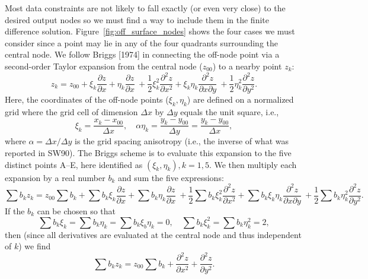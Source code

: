 \documentclass[12pt,letterpaper,margin=0.5in]{article}
\begin{document}
Most data constraints are not likely to fall exactly (or even very close) to the
desired output nodes so we must find a way to include them in the finite difference
solution.  Figure~\ref{fig:off_surface_nodes} shows the four cases we must consider since
a point may lie in any of the four quadrants surrounding the central node.
We follow Briggs [1974] in connecting the off-node point via a
second-order Taylor expansion from the central node ($z_{00}$) to a nearby point $z_k$:
\begin{equation}
	z_k = z_{00} + \xi_k \frac{\partial z}{\partial x} + \eta_k \frac{\partial z}{\partial x} \
	+ \frac{1}{2} \xi^2_k \frac{\partial^2 z}{\partial x^2} + \xi_k \eta_k \frac{\partial^2 z}{\partial x \partial y} \
	+ \frac{1}{2}  \eta^2_k \frac{\partial^2 z}{\partial y^2}.
\end{equation}
Here, the coordinates of the off-node points ($\xi_k, \eta_k$) are defined on a normalized
grid where the grid cell of dimension $\Delta x$ by $\Delta y$ equals the unit square, i.e.,
\begin{equation}
\xi_k = \frac{x_k-x_{00}}{\Delta x}, \quad \alpha \eta_k = \frac{y_k-y_{00}}{\Delta y} = \frac{y_k-y_{00}}{\Delta x},
\end{equation}
where $\alpha = \Delta x/ \Delta y$ is the grid spacing anisotropy (i.e., the inverse of what was reported in SW90).
The Briggs scheme is to evaluate this expansion to the five distinct points A--E, here identified as $(\xi_k, \eta_k), k = 1,5$.
We then multiply each expansion by a real number $b_k$ and sum the five expressions:
\begin{equation}
	\sum b_k z_k = z_{00}\sum b_k  + \sum b_k \xi_k \frac{\partial z}{\partial x} + \sum b_k \eta_k \frac{\partial z}{\partial x} \
	+ \frac{1}{2} \sum b_k \xi^2_k \frac{\partial^2 z}{\partial x^2} + \sum b_k \xi_k \eta_k \frac{\partial^2 z}{\partial x \partial y} \
	+ \frac{1}{2} \sum b_k \eta^2_k \frac{\partial^2 z}{\partial y^2}.
\end{equation}
If the $b_k$ can be chosen so that
\begin{equation}
\sum b_k \xi_k = \sum b_k \eta_k = \sum b_k \xi_b \eta_k = 0, \quad \sum b_k \xi^2_k = \sum b_k \eta^2_k = 2,
\label{eq:define}
\end{equation}
then (since all derivatives are evaluated at the central node and thus independent of $k$) we find
\begin{equation}
	\sum b_k z_k = z_{00}\sum b_k  + \frac{\partial^2 z}{\partial x^2} + \frac{\partial^2 z}{\partial y^2}.
\end{equation}
\end{document}
